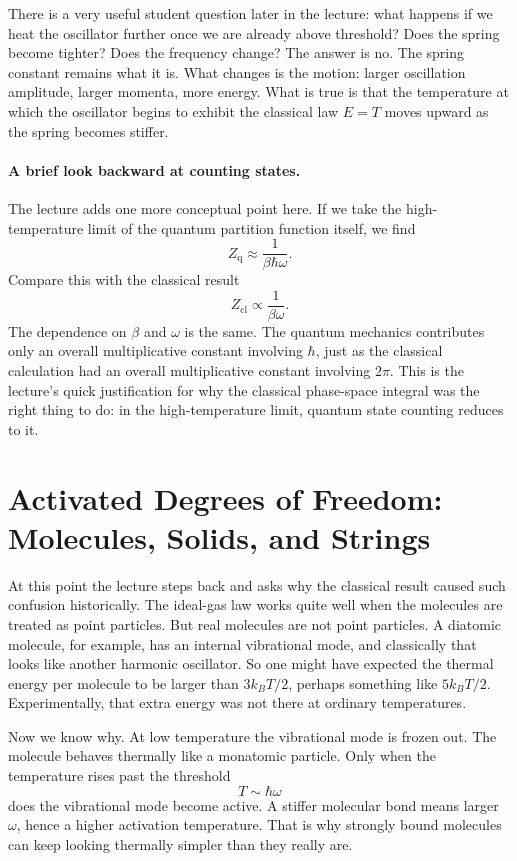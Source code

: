 There is a very useful student question later in the lecture: what happens if we heat the oscillator further once we are already above threshold? Does the spring become tighter? Does the frequency change? The answer is no. The spring constant remains what it is. What changes is the motion: larger oscillation amplitude, larger momenta, more energy. What is true is that the temperature at which the oscillator begins to exhibit the classical law \(E=T\) moves upward as the spring becomes stiffer.

\paragraph{A brief look backward at counting states.} The lecture adds one more conceptual point here. If we take the high-temperature limit of the quantum partition function itself, we find
\begin{equation}
Z_{\mathrm{q}}\approx \frac{1}{\beta\hbar\omega}.
\end{equation}
Compare this with the classical result
\begin{equation}
Z_{\mathrm{cl}}\propto \frac{1}{\beta\omega}.
\end{equation}
The dependence on \(\beta\) and \(\omega\) is the same. The quantum mechanics contributes only an overall multiplicative constant involving \(\hbar\), just as the classical calculation had an overall multiplicative constant involving \(2\pi\). This is the lecture's quick justification for why the classical phase-space integral was the right thing to do: in the high-temperature limit, quantum state counting reduces to it.

\section{Activated Degrees of Freedom: Molecules, Solids, and Strings}

At this point the lecture steps back and asks why the classical result caused such confusion historically. The ideal-gas law works quite well when the molecules are treated as point particles. But real molecules are not point particles. A diatomic molecule, for example, has an internal vibrational mode, and classically that looks like another harmonic oscillator. So one might have expected the thermal energy per molecule to be larger than \(3k_B T/2\), perhaps something like \(5k_B T/2\). Experimentally, that extra energy was not there at ordinary temperatures.

Now we know why. At low temperature the vibrational mode is frozen out. The molecule behaves thermally like a monatomic particle. Only when the temperature rises past the threshold
\begin{equation}
T\sim \hbar\omega
\end{equation}
does the vibrational mode become active. A stiffer molecular bond means larger \(\omega\), hence a higher activation temperature. That is why strongly bound molecules can keep looking thermally simpler than they really are.

